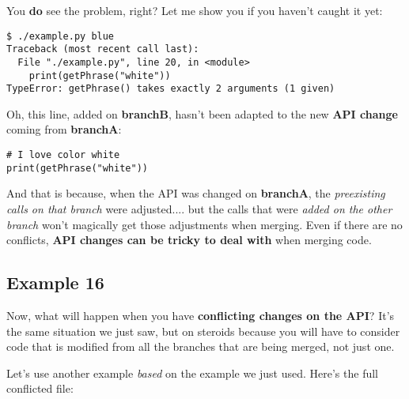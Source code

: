 You {\bf do} see the problem, right? Let me show you if you haven't caught it yet:

\begin{lstlisting}[style=console_style,
	basicstyle=\small,
	caption={\bf example 15} - we have a problem]
$ ./example.py blue
Traceback (most recent call last):
  File "./example.py", line 20, in <module>
    print(getPhrase("white"))
TypeError: getPhrase() takes exactly 2 arguments (1 given)
\end{lstlisting}

Oh, this line, added on {\bf branchB}, hasn't been adapted to the new {\bf API change} coming from {\bf branchA}:

\begin{lstlisting}[style=python_style,
	basicstyle=\small,
	firstnumber=19,
	caption={\bf example 15} - this is the problem]
# I love color white
print(getPhrase("white"))
\end{lstlisting}

And that is because, when the API was changed on {\bf branchA}, the {\it preexisting calls on that branch} were adjusted.... but the
calls that were {\it added on the other branch} won't magically get those adjustments when merging. Even if there are no conflicts,
{\bf API changes can be tricky to deal with} when merging code.

\subsection{Example 16}
\label{example_16}

Now, what will happen when you have {\bf conflicting changes on the API}? It's the same situation we just saw, but on steroids
because you will have to consider code that is modified from all the branches that are being merged, not just one.

Let's use another example {\it based} on the example we just used. Here's the full conflicted file:

